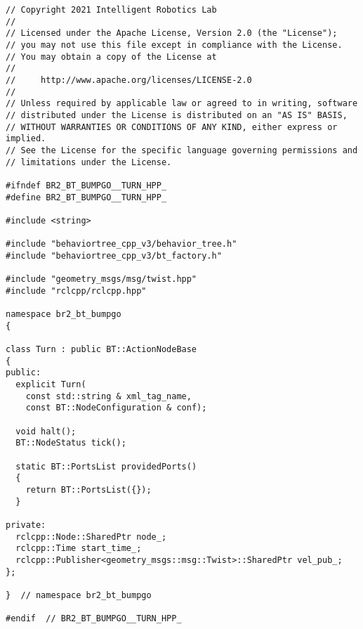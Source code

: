  \footnotesize
\begin{tcolorbox}[sharp corners, colframe=gray!80, colback=LightGray, left=0pt, top=0pt, bottom=0pt, title=\texttt{br2\_bt\_bumpgo/include/br2\_bt\_bumpgo/Turn.hpp}]
  \begin{verbatim}
// Copyright 2021 Intelligent Robotics Lab
//
// Licensed under the Apache License, Version 2.0 (the "License");
// you may not use this file except in compliance with the License.
// You may obtain a copy of the License at
//
//     http://www.apache.org/licenses/LICENSE-2.0
//
// Unless required by applicable law or agreed to in writing, software
// distributed under the License is distributed on an "AS IS" BASIS,
// WITHOUT WARRANTIES OR CONDITIONS OF ANY KIND, either express or implied.
// See the License for the specific language governing permissions and
// limitations under the License.

#ifndef BR2_BT_BUMPGO__TURN_HPP_
#define BR2_BT_BUMPGO__TURN_HPP_

#include <string>

#include "behaviortree_cpp_v3/behavior_tree.h"
#include "behaviortree_cpp_v3/bt_factory.h"

#include "geometry_msgs/msg/twist.hpp"
#include "rclcpp/rclcpp.hpp"

namespace br2_bt_bumpgo
{

class Turn : public BT::ActionNodeBase
{
public:
  explicit Turn(
    const std::string & xml_tag_name,
    const BT::NodeConfiguration & conf);

  void halt();
  BT::NodeStatus tick();

  static BT::PortsList providedPorts()
  {
    return BT::PortsList({});
  }

private:
  rclcpp::Node::SharedPtr node_;
  rclcpp::Time start_time_;
  rclcpp::Publisher<geometry_msgs::msg::Twist>::SharedPtr vel_pub_;
};

}  // namespace br2_bt_bumpgo

#endif  // BR2_BT_BUMPGO__TURN_HPP_
    \end{verbatim}
    \end{tcolorbox}
  \normalsize

